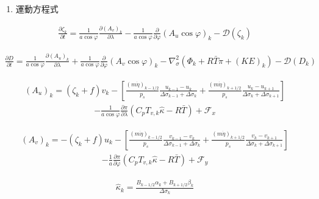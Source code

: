 \begin{enumerate}
\def\labelenumi{\arabic{enumi}.}
\setcounter{enumi}{2}
\tightlist
\item
  運動方程式
\end{enumerate}

\begin{eqnarray}
  \frac{\partial \zeta_k}{\partial t} 
        =   \frac{1}{a\cos\varphi} 
            \frac{\partial (A_v)_k}{\partial \lambda}
          - \frac{1}{a\cos\varphi} 
            \frac{\partial }{\partial \varphi} (A_u \cos\varphi)_k
          - {\mathcal D}(\zeta_k) 
\end{eqnarray}

\begin{eqnarray}
  \frac{\partial D}{\partial t} 
        =   \frac{1}{a\cos\varphi} 
            \frac{\partial (A_u)_k}{\partial \lambda}
          + \frac{1}{a\cos\varphi} 
            \frac{\partial }{\partial \varphi} (A_v \cos\varphi)_k
          - \nabla^{2}_{\sigma}
           ( \Phi_k + R\bar{T} \pi 
             + ({\mathit KE})_k )
          - {\mathcal D}(D_k) 
\end{eqnarray}

\begin{eqnarray}
  (A_u)_k
    =  ( \zeta_k + f ) v_k 
             - \left[ \frac{(m\dot{\eta})_{k-1/2}}{p_s} \frac{u_{k-1} - u_k}{\Delta\sigma_{k-1}+\Delta\sigma_k}
               + \frac{(m\dot{\eta})_{k+1/2}}{p_s} \frac{u_k   - u_{k+1}}{\Delta\sigma_{k}+\Delta\sigma_{k+1}} \right]
\end{eqnarray} \begin{eqnarray}
           - \frac{1}{a\cos\varphi} \frac{\partial \pi}{\partial \lambda}(C_p T_{v,k}\hat{\kappa}-R\bar{T})
             + {\mathcal F}_x
\end{eqnarray}

\begin{eqnarray}
  (A_v)_k
    =  - ( \zeta_k + f ) u_k 
             - \left[ \frac{(m\dot{\eta})_{k-1/2}}{p_s} \frac{v_{k-1} - v_k}{\Delta\sigma_{k-1}+\Delta\sigma_k}
               + \frac{(m\dot{\eta})_{k+1/2}}{p_s} \frac{v_k   - v_{k+1}}{\Delta\sigma_{k}+\Delta\sigma_{k+1}} \right]
\end{eqnarray} \begin{eqnarray}
           - \frac{1}{a} \frac{\partial \pi}{\partial \varphi}(C_p T_{v,k}\hat{\kappa}-R\bar{T})
             + {\mathcal F}_y
\end{eqnarray}

\begin{eqnarray}
   \hat{\kappa}_k 
    = \frac{ B_{k-1/2} \alpha_k + B_{k+1/2} \beta_k }
            { \Delta\sigma_k                                  } 
\end{eqnarray}

